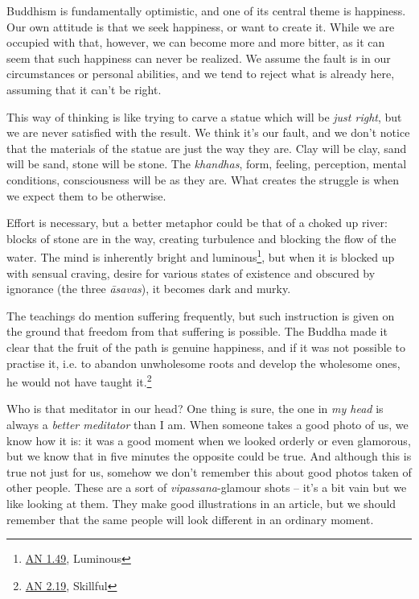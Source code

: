 
Buddhism is fundamentally optimistic, and one of its central theme is
happiness. Our own attitude is that we seek happiness, or want to create
it. While we are occupied with that, however, we can become more and
more bitter, as it can seem that such happiness can never be realized.
We assume the fault is in our circumstances or personal abilities, and
we tend to reject what is already here, assuming that it can't be right.

This way of thinking is like trying to carve a statue which will be
\emph{just right}, but we are never satisfied with the result. We think
it's our fault, and we don't notice that the materials of the statue are
just the way they are. Clay will be clay, sand will be sand, stone will
be stone. The \emph{khandhas}, form, feeling, perception, mental
conditions, consciousness will be as they are. What creates the struggle
is when we expect them to be otherwise.

Effort is necessary, but a better metaphor could be that of a choked up
river: blocks of stone are in the way, creating turbulence and blocking
the flow of the water. The mind is inherently bright and
luminous\footnote{\href{https://suttacentral.net/an1.41-50/en/thanissaro}{AN
  1.49}, Luminous}, but when it is blocked up with sensual craving,
desire for various states of existence and obscured by ignorance (the
three \emph{āsavas}), it becomes dark and murky.

The teachings do mention suffering frequently, but such instruction is
given on the ground that freedom from that suffering is possible. The
Buddha made it clear that the fruit of the path is genuine happiness,
and if it was not possible to practise it, i.e. to abandon unwholesome
roots and develop the wholesome ones, he would not have taught
it.\footnote{\href{https://suttacentral.net/an2.11-20/en/thanissaro}{AN
  2.19}, Skillful}

Who is that meditator in our head? One thing is sure, the one in
\emph{my head} is always a \emph{better meditator} than I am. When
someone takes a good photo of us, we know how it is: it was a good
moment when we looked orderly or even glamorous, but we know that in
five minutes the opposite could be true. And although this is true not
just for us, somehow we don't remember this about good photos taken of
other people. These are a sort of \emph{vipassana}-glamour shots -- it's
a bit vain but we like looking at them. They make good illustrations in
an article, but we should remember that the same people will look
different in an ordinary moment.

